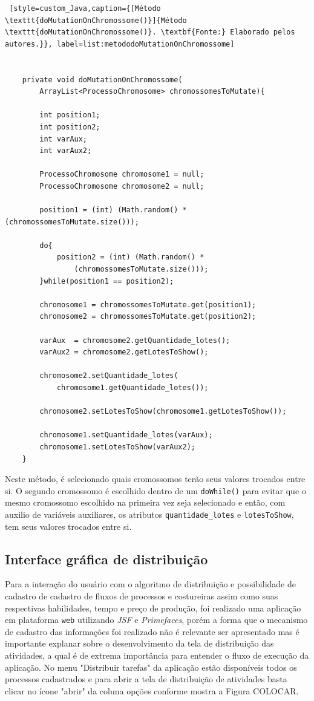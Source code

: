 \begin{lstlisting} [style=custom_Java,caption={[Método \texttt{doMutationOnChromossome()}]{Método \texttt{doMutationOnChromossome()}. \textbf{Fonte:} Elaborado pelos autores.}}, label=list:metododoMutationOnChromossome] 


	private void doMutationOnChromossome(
		ArrayList<ProcessoChromosome> chromossomesToMutate){
	
		int position1;
		int position2;
		int varAux;
		int varAux2;
		
		ProcessoChromosome chromosome1 = null;
		ProcessoChromosome chromosome2 = null;
		
		position1 = (int) (Math.random() * (chromossomesToMutate.size()));
		
		do{
			position2 = (int) (Math.random() * 
				(chromossomesToMutate.size()));
		}while(position1 == position2);
	
		chromosome1 = chromossomesToMutate.get(position1);
		chromosome2 = chromossomesToMutate.get(position2);
		
		varAux  = chromosome2.getQuantidade_lotes();
		varAux2 = chromosome2.getLotesToShow();
		
		chromosome2.setQuantidade_lotes(
			chromosome1.getQuantidade_lotes());
			
		chromosome2.setLotesToShow(chromosome1.getLotesToShow());
		
		chromosome1.setQuantidade_lotes(varAux);
		chromosome1.setLotesToShow(varAux2);
	}

\end{lstlisting}

\par Neste método, é selecionado quais cromossomos terão seus valores trocados entre si. O segundo cromossomo é escolhido dentro de um
\texttt{doWhile()} para evitar que o mesmo cromossomo escolhido na primeira vez seja selecionado e então, com auxilio de variáveis
auxiliares, os atributos \texttt{quantidade\_lotes} e \texttt{lotesToShow}, tem seus valores trocados entre si.

\subsection{Interface gráfica de distribuição} 

\par Para a interação do usuário com o algoritmo de distribuição e possibilidade de cadastro de cadastro de fluxos de processos e 
costureiras assim como suas respectivas habilidades, tempo e preço de produção, foi realizado uma aplicação em plataforma \texttt{web}
utilizando \textit{JSF} e \textit{Primefaces}, porém a forma que o mecanismo de cadastro das informações foi realizado não é relevante
ser apresentado mas é importante explanar sobre o desenvolvimento da tela de distribuição das atividades, a qual é de extrema importância para 
entender o fluxo de execução da aplicação. No menu "Distribuir tarefas" da aplicação estão disponíveis todos os processos cadastrados e
para abrir a tela de distribuição de atividades basta clicar no ícone "abrir" da coluna opções conforme mostra a Figura COLOCAR.

